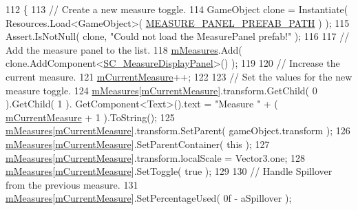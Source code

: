 \begin{DoxyCode}
112     \{
113         \textcolor{comment}{// Create a new measure toggle.}
114         GameObject clone = Instantiate( Resources.Load<GameObject>( 
      \hyperlink{class_note_display_container_a50e30949ce455a140c4c2a317ac0406e}{MEASURE\_PANEL\_PREFAB\_PATH} ) );
115         Assert.IsNotNull( clone, \textcolor{stringliteral}{"Could not load the MeasurePanel prefab!"} );
116 
117         \textcolor{comment}{// Add the measure panel to the list.}
118         \hyperlink{class_note_display_container_ae5ca6e7ea4ab2baaab9ff649bf25c0d6}{mMeasures}.Add( clone.AddComponent<\hyperlink{class_s_c___measure_display_panel}{SC\_MeasureDisplayPanel}>() );
119 
120         \textcolor{comment}{// Increase the current measure.}
121         \hyperlink{class_note_display_container_a79a97c9e0f45ba4242b66d6ec317d020}{mCurrentMeasure}++;
122 
123         \textcolor{comment}{// Set the values for the new measure toggle.}
124         \hyperlink{class_note_display_container_ae5ca6e7ea4ab2baaab9ff649bf25c0d6}{mMeasures}[\hyperlink{class_note_display_container_a79a97c9e0f45ba4242b66d6ec317d020}{mCurrentMeasure}].transform.GetChild( 0 ).GetChild( 1 ).
      GetComponent<Text>().text = \textcolor{stringliteral}{"Measure "} + ( \hyperlink{class_note_display_container_a79a97c9e0f45ba4242b66d6ec317d020}{mCurrentMeasure} + 1 ).ToString();
125         \hyperlink{class_note_display_container_ae5ca6e7ea4ab2baaab9ff649bf25c0d6}{mMeasures}[\hyperlink{class_note_display_container_a79a97c9e0f45ba4242b66d6ec317d020}{mCurrentMeasure}].transform.SetParent( gameObject.transform );
126         \hyperlink{class_note_display_container_ae5ca6e7ea4ab2baaab9ff649bf25c0d6}{mMeasures}[\hyperlink{class_note_display_container_a79a97c9e0f45ba4242b66d6ec317d020}{mCurrentMeasure}].SetParentContainer( \textcolor{keyword}{this} );
127         \hyperlink{class_note_display_container_ae5ca6e7ea4ab2baaab9ff649bf25c0d6}{mMeasures}[\hyperlink{class_note_display_container_a79a97c9e0f45ba4242b66d6ec317d020}{mCurrentMeasure}].transform.localScale = Vector3.one;
128         \hyperlink{class_note_display_container_ae5ca6e7ea4ab2baaab9ff649bf25c0d6}{mMeasures}[\hyperlink{class_note_display_container_a79a97c9e0f45ba4242b66d6ec317d020}{mCurrentMeasure}].SetToggle( \textcolor{keyword}{true} );
129 
130         \textcolor{comment}{// Handle Spillover from the previous measure.}
131         \hyperlink{class_note_display_container_ae5ca6e7ea4ab2baaab9ff649bf25c0d6}{mMeasures}[\hyperlink{class_note_display_container_a79a97c9e0f45ba4242b66d6ec317d020}{mCurrentMeasure}].SetPercentageUsed( 0f - aSpillover );

\end{DoxyCode}
